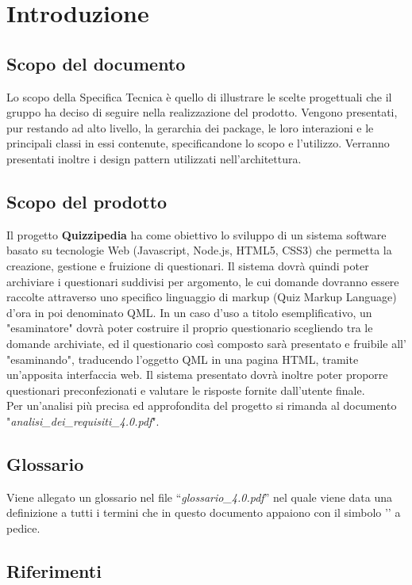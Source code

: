 \documentclass[a4paper,11pt]{article}
\begin{document}
	\newpage
	\section{Introduzione}
	\subsection{Scopo del documento}
	Lo scopo della Specifica Tecnica è quello di illustrare le scelte progettuali che il gruppo ha deciso di seguire nella realizzazione del prodotto. Vengono presentati, pur restando ad alto
livello, la gerarchia dei package, le loro interazioni e le principali classi in essi contenute, specificandone lo scopo e l'utilizzo. Verranno presentati inoltre i design pattern utilizzati nell'architettura.
	
	\subsection{Scopo del prodotto}
	Il progetto \textbf{Quizzipedia} ha come obiettivo lo sviluppo di un sistema software basato su tecnologie Web (Javascript\addglos, Node.js\addglos, HTML5\addglos, CSS3\addglos) che permetta la creazione, gestione e fruizione di questionari. Il sistema dovrà quindi poter archiviare i questionari suddivisi per argomento, le cui domande dovranno essere raccolte attraverso uno specifico linguaggio di markup (Quiz Markup Language) d'ora in poi denominato QML\addglos. In un caso d'uso a titolo esemplificativo, un "esaminatore" dovrà poter costruire il proprio questionario scegliendo tra le domande archiviate, ed il questionario così composto sarà presentato e fruibile all' "esaminando", traducendo l'oggetto QML in una pagina HTML\addglos, tramite un'apposita interfaccia web. Il sistema presentato dovrà inoltre poter proporre questionari preconfezionati e valutare le risposte fornite dall'utente finale.
	\\
	Per un'analisi più precisa ed approfondita del progetto si rimanda al documento\\ "\textit{analisi\_dei\_requisiti\_4.0.pdf}".
	\subsection{Glossario}
	Viene allegato un glossario nel file ``\textit{glossario\_4.0.pdf}'' nel quale viene data una definizione a tutti i termini che in questo documento appaiono con il simbolo '\addglos' a pedice.
	\subsection{Riferimenti}
\end{document}

